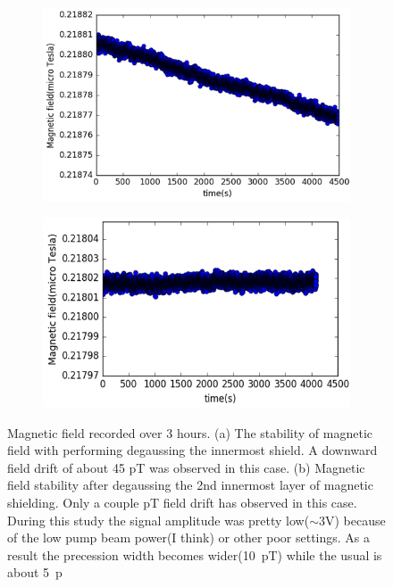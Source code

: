\begin{figure}
  \centering
  \begin{subfigure}[b]{0.45\textwidth}
    \centering
    \includegraphics[width=\textwidth]{figures/before_degaussing}
    \caption{}
    \label{fig:with DG_innermost}
  \end{subfigure}
  \hfill
  \begin{subfigure}[b]{0.45\textwidth}
    \centering
    \includegraphics[width=\textwidth]{figures/after_degaussing}
    \caption{}
    \label{fig:with DG}
  \end{subfigure}
  \caption{Magnetic field recorded over 3 hours. (a) The stability of
    magnetic field with performing degaussing the innermost shield. A downward field
    drift of about 45 pT was observed in this case.  (b) Magnetic field
    stability after degaussing the 2nd innermost layer of magnetic
    shielding. Only a couple pT field drift has observed in this case. During this study the signal amplitude was pretty
    low($\sim$3V) because of the low pump beam power(I think) or other poor settings. As a result the precession width becomes wider(10~pT)
  while the usual is about 5~p
    \label{fig:effect of DG}}
\end{figure}

